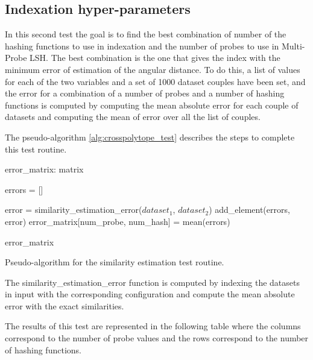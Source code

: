 \subsection{Indexation hyper-parameters}
In this second test the goal is to find the best combination of number of the
hashing functions to use in indexation and the number of probes to use in
Multi-Probe LSH. The best combination is the one that gives the index with the
minimum error of estimation of the angular distance. To do this, a list of
values for each of the two variables and a set of 1000 dataset couples have been
set, and the error for a combination of a number of probes and a number of
hashing functions is computed by computing the mean absolute error for each
couple of datasets and computing the mean of error over all the list of couples.

The pseudo-algorithm \ref{alg:crosspolytope_test} describes the steps to
complete this test routine.

\begin{algorithm}[H]
    \SetAlgoLined
    \label{alg:crosspolytope_test}
    error\_matrix: matrix

    {
        errors = []

        {
            error = similarity\_estimation\_error($dataset_1$, $dataset_2$)
            add\_element(errors, error)
        }
        error\_matrix[num\_probe, num\_hash] = mean(errors)
    }

    \Return error\_matrix
    \caption{Pseudo-algorithm for the similarity estimation test routine.}

\end{algorithm}

The similarity\_estimation\_error function is computed by indexing the datasets
in input with the corresponding configuration and compute the mean absolute
error with the exact similarities.

The results of this test are represented in the following table where the
columns correspond to the number of probe values and the rows correspond to the
number of hashing functions.

\hspace{1cm}

